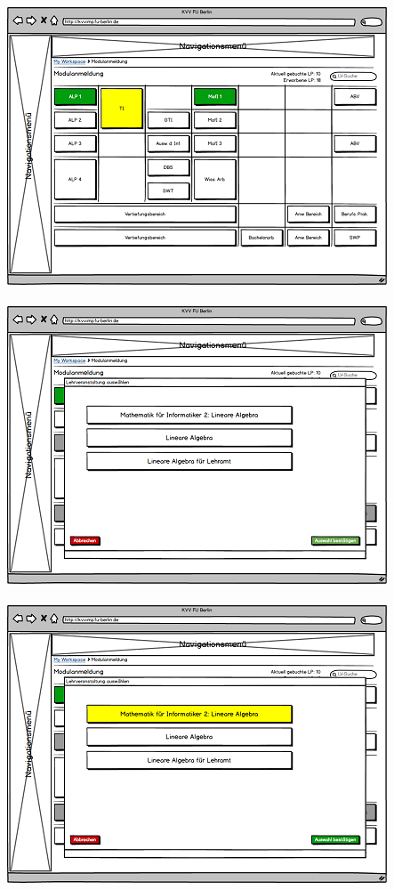 \documentclass{article}
\begin{document}
\includegraphics{ucd_ppt_start.png}\\
\\
\includegraphics{ucd_ppt_lv_select.png}\\
\\
\includegraphics{ucd_ppt_lv_selected.png}\\
\end{document}
